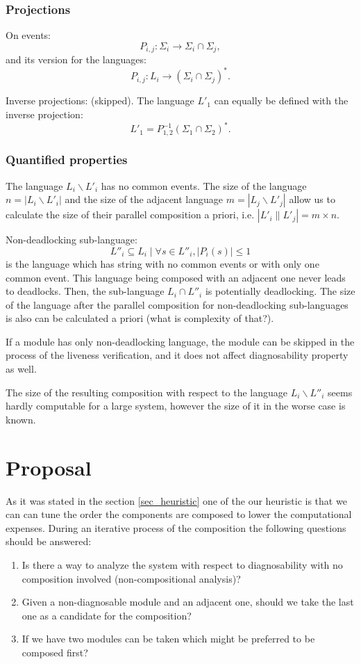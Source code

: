 \documentclass[a4paper,oneside]{article}
\begin{document}
\subsubsection{Projections} On events:
\label{sec_projections}
$$P_{i,j} : \Sigma_i \rightarrow \Sigma_i \cap \Sigma_j,$$
and its version for the languages: 
$$P_{i,j} : L_i \rightarrow (\Sigma_i \cap \Sigma_j)^*.$$

Inverse projections: (skipped). 
The language $L'_1$ can equally be defined with the inverse projection:
$$
L'_1 = P^{-1}_{1,2}(\Sigma_1 \cap \Sigma_2)^*.
$$

\subsubsection{Quantified properties}
The language $L_i \backslash L'_i$ has no common events. The size of the
language $n = |L_i \backslash L'_i|$ and the size of the adjacent language $m = |L_j \backslash L'_j|$ allow us to calculate the
size of their parallel composition a priori, i.e. 
$|L'_i \parallel L'_j| = m \times n$.

Non-deadlocking sub-language:
$$
L''_i \subseteq L_i \mid \forall s \in L''_i, |P_i(s)| \leq 1 
$$
is the language which has string with no common events or with only one common
event. This language being composed with an adjacent one never leads to
deadlocks. Then, the sub-language $L_i \cap L''_i$ is potentially deadlocking.
The size of the language after the parallel composition for non-deadlocking
sub-languages is also can be calculated a priori (what is complexity of that?).

If a module has only non-deadlocking language, the module can be skipped in the
process of the liveness verification, and it does not affect diagnosability
property as well.

The size of the resulting composition with respect to the language $L_i
\backslash L''_i$ seems hardly computable for a large system, however the size
of it in the worse case is known.


\newpage

\section{Proposal}
As it was stated in the section \ref{sec_heuristic} one of the our heuristic is
that we can can tune the order the components are composed to lower the
computational expenses. During an iterative process of the composition the
following questions should be answered:
\begin{enumerate}
  \item Is there a way to analyze the system with respect to diagnosability with
  no composition involved (non-compositional analysis)?
  \item Given a non-diagnosable module and an adjacent one, should we take
  the last one as a candidate for the composition?
  \item If we have two modules can be taken which might be preferred to be
  composed first?
\end{enumerate}
\end{document}
